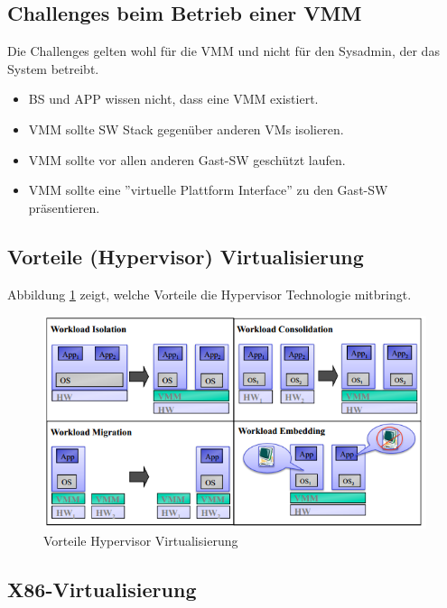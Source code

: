 \subsection{Challenges beim Betrieb einer VMM}
Die Challenges gelten wohl für die VMM und nicht für den Sysadmin, der das System betreibt.
\begin{itemize}
	\item BS und APP wissen nicht, dass eine VMM existiert.
	\item VMM sollte SW Stack gegenüber anderen VMs isolieren.
	\item VMM sollte vor allen anderen Gast-SW geschützt laufen.
	\item VMM sollte eine ''virtuelle Plattform Interface'' zu den Gast-SW präsentieren.
\end{itemize}

\subsection{Vorteile (Hypervisor) Virtualisierung}
Abbildung \ref{fig:vorteile-hypervisor-virtualisierung} zeigt, welche Vorteile die Hypervisor Technologie mitbringt.

\begin{figure}[h!]
	\centering
	\includegraphics[width=0.7\linewidth]{fig/vorteile-hypervisor-virtualisierung}
	\caption{Vorteile Hypervisor Virtualisierung}
	\label{fig:vorteile-hypervisor-virtualisierung}
\end{figure}

\subsection{X86-Virtualisierung}
